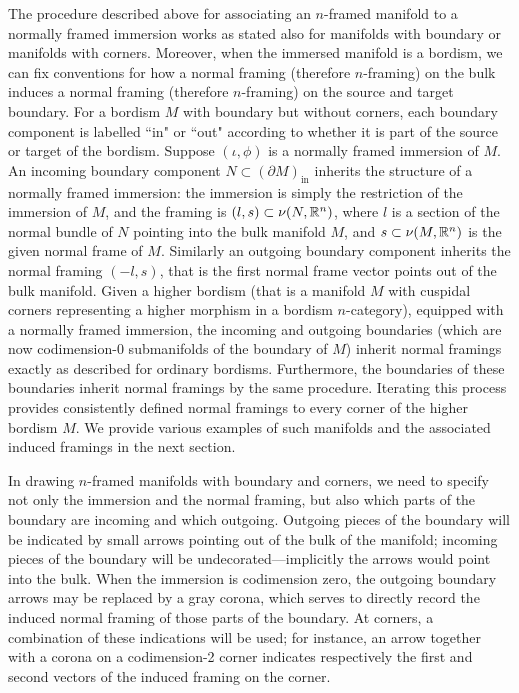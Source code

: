 \documentclass{amsart}
\begin{document}
The procedure described above for associating an $n$-framed manifold to a normally framed immersion works as stated also for manifolds with boundary or manifolds with corners.  Moreover, when the immersed manifold is a bordism, we can fix conventions for how a normal framing (therefore $n$-framing) on the bulk induces a normal framing (therefore $n$-framing) on the source and target boundary.  For a bordism $M$ with boundary but without corners, each boundary component is labelled ``in" or ``out" according to whether it is part of the source or target of the bordism.  Suppose $(\iota, \phi)$ is a normally framed immersion of $M$.  An incoming boundary component $N \subset (\partial M)_{\textrm{in}}$ inherits the structure of a normally framed immersion: the immersion is simply the restriction of the immersion of $M$, and the framing is $(l,s) \subset \nu(N,\mathbb R^n)$, where $l$ is a section of the normal bundle of $N$ pointing into the bulk manifold $M$, and $s \subset \nu(M,\mathbb R^n)$ is the given normal frame of $M$.  Similarly an outgoing boundary component inherits the normal framing $(-l,s)$, that is the first normal frame vector points out of the bulk manifold.  Given a higher bordism (that is a manifold $M$ with cuspidal corners representing a higher morphism in a bordism $n$-category), equipped with a normally framed immersion, the incoming and outgoing boundaries (which are now codimension-0 submanifolds of the boundary of $M$) inherit normal framings exactly as described for ordinary bordisms.  Furthermore, the boundaries of these boundaries inherit normal framings by the same procedure.  Iterating this process provides consistently defined normal framings to every corner of the higher bordism $M$.  We provide various examples of such manifolds and the associated induced framings in the next section.

In drawing $n$-framed manifolds with boundary and corners, we need to specify not only the immersion and the normal framing, but also which parts of the boundary are incoming and which outgoing.  Outgoing pieces of the boundary will be indicated by small arrows pointing out of the bulk of the manifold; incoming pieces of the boundary will be undecorated---implicitly the arrows would point into the bulk.  When the immersion is codimension zero, the outgoing boundary arrows may be replaced by a gray corona, which serves to directly record the induced normal framing of those parts of the boundary.  At corners, a combination of these indications will be used; for instance, an arrow together with a corona on a codimension-2 corner indicates respectively the first and second vectors of the induced framing on the corner.
\end{document}
